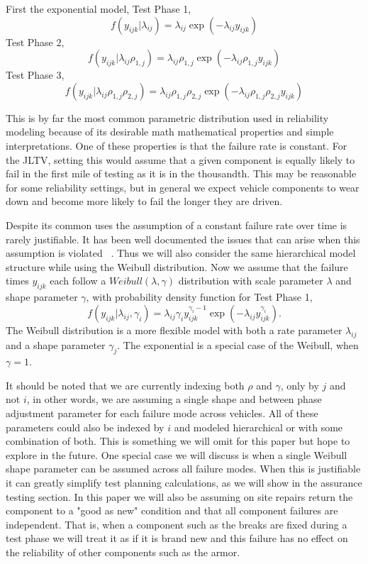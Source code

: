 \documentclass[12pt]{article}
\begin{document}
First the exponential model, Test Phase 1,
\begin{equation} f(y_{ijk}|\lambda_{ij})=\lambda_{ij} \exp(-\lambda_{ij}
y_{ijk})
\end{equation}
Test Phase 2,
\begin{equation}
f(y_{ijk}|\lambda_{ij}\rho_{1,j})=\lambda_{ij}\rho_{1,j}
\exp(-\lambda_{ij}\rho_{1,j} y_{ijk})
\end{equation}
Test Phase 3,
\begin{equation}
f(y_{ijk}|\lambda_{ij}\rho_{1,j}\rho_{2,j})=\lambda_{ij}\rho_{1,j}\rho_{2,j}
\exp(-\lambda_{ij}\rho_{1,j}\rho_{2,j} y_{ijk})
\end{equation}

This is by far the most common parametric distribution used in reliability
modeling because of its desirable math mathematical properties and simple
interpretations.  One of these properties is that the failure rate is constant.
For the JLTV, setting this would assume that a given component is equally likely
to fail in the first mile of testing as it is in the thousandth.  This may be
reasonable for some reliability settings, but in general we expect vehicle
components to wear down and become more likely to fail the longer they are
driven.

Despite its common uses the assumption of a constant failure rate over time is
rarely justifiable.  It has been well documented the issues that can arise when
this assumption is violated ~\cite{ref2}.  Thus we will also consider the same
hierarchical model structure while using the Weibull distribution.  Now we
assume that the failure times $y_{ijk}$ each follow a $Weibull(\lambda, \gamma)$
distribution with scale parameter $\lambda$ and shape parameter $\gamma$, with
probability density function for Test Phase 1,
\begin{equation}
f(y_{ijk}|\lambda_{ij},\gamma_{i})=\lambda_{ij}\gamma_{i}
y_{ijk}^{\gamma_{i}-1}\exp(-\lambda_{ij} y_{ijk}^{\gamma_{i}}).
\end{equation}
The Weibull distribution is a more flexible model with both a rate parameter
$\lambda_{ij}$ and a shape parameter $\gamma_{j}$.  The exponential is a special
case of the Weibull, when $\gamma = 1$.

It should be noted that we are currently indexing both $\rho$ and $\gamma$, only
by $j$ and not $i$, in other words, we are assuming a single shape and between
phase adjustment parameter for each failure mode across vehicles.  All of these
parameters could also be indexed by $i$ and modeled hierarchical or with some
combination of both.  This is something we will omit for this paper but hope to
explore in the future.  One special case we will discuss is when a single
Weibull shape parameter can be assumed across all failure modes.  When this is
justifiable it can greatly simplify test planning calculations, as we will show
in the assurance testing section.  In this paper we will also be assuming on
site repairs return the component to a "good as new" condition and that all
component failures are independent.  That is, when a component such as the
breaks are fixed during a test phase we will treat it as if it is brand  new and
this failure has no effect on the reliability of other components such as the
armor.
\end{document}
